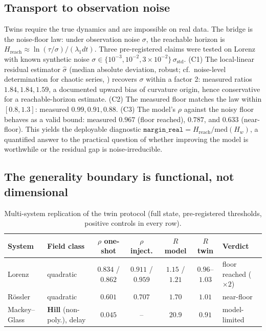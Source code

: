 \documentclass[aps,pre,twocolumn,superscriptaddress,nofootinbib,longbibliography]{revtex4-2}
\newcommand{\Hw}{H_w}
\begin{document}
\subsection{Transport to observation noise}
\label{sec:noise}

Twins require the true dynamics and are impossible on real data. The
bridge is the noise-floor law: under observation noise $\sigma$, the
reachable horizon is $H_{\mathrm{reach}} \approx
\ln(\tau/\sigma)/(\lambda_1 dt)$. Three pre-registered claims were tested
on Lorenz with known synthetic noise
$\sigma \in \{10^{-3}, 10^{-2}, 3\times 10^{-2}\}\,\sigma_{\mathrm{std}}$.
(C1) The local-linear residual estimator $\hat\sigma$ (median absolute
deviation, robust; cf.\ noise-level determination for chaotic series,
\citealp{schreiber1993determination}) recovers $\sigma$ within a factor
2: measured ratios $1.84, 1.84, 1.59$, a documented upward bias of
curvature origin, hence conservative for a reachable-horizon estimate.
(C2) The measured floor matches the law within $[0.8, 1.3]$: measured
$0.99, 0.91, 0.88$. (C3) The model's $\rho$ against the noisy floor
behaves as a valid bound: measured $0.967$ (floor reached), $0.787$, and
$0.633$ (near-floor). This yields the deployable diagnostic
$\texttt{margin\_real} = H_{\mathrm{reach}}/\mathrm{med}(\Hw)$, a
quantified answer to the practical question of whether improving the
model is worthwhile or the residual gap is noise-irreducible.

\subsection{The generality boundary is functional, not dimensional}
\label{sec:boundary}

\begin{table}[t]
\centering
\begin{tabular}{l l c c c c l}
\toprule
System & Field class & $\rho$ one-shot & $\rho$ inject. & $R$ model &
$R$ twin & Verdict \\
\midrule
Lorenz & quadratic & $0.834$ / $0.862$ & $0.911$ / $0.959$ &
$1.15$ / $1.21$ & $0.96$--$1.03$ & floor reached ($\times 2$) \\
R\"ossler & quadratic & $0.601$ & $0.707$ & $1.70$ & $1.01$ &
near-floor \\
Mackey--Glass & \textbf{Hill} (non-poly.), delay & $0.045$ & -- &
$20.9$ & $0.91$ & model-limited \\
\bottomrule
\end{tabular}
\caption{Multi-system replication of the twin protocol (full state,
pre-registered thresholds, positive controls in every row).}
\label{tab:multisystem}
\end{table}
\end{document}
